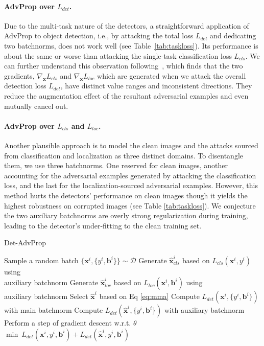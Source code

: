 \documentclass[final]{cvpr}
\begin{document}
\paragraph{AdvProp over $L_{det}$.}
Due to the multi-task nature of the detectors, a straightforward application of AdvProp to object detection, i.e., by attacking the total loss $L_{det}$ and dedicating two batchnorms, does not work well (see Table~\ref{tab:taskloss}). Its performance is about the same or worse than attacking the single-task classification loss $L_{cls}$. We can further understand this observation following~\cite{zhang2019towards}, which finds that the two gradients, $\nabla_\textbf{x}L_{cls}$ and $\nabla_\textbf{x}L_{loc}$ which are generated when we attack the overall detection loss $L_{det}$, have distinct value ranges and inconsistent directions. They reduce the augmentation effect of the resultant adversarial examples and even mutually cancel out.


\vspace{-10pt}
\paragraph{AdvProp over $L_{cls}$ and $L_{loc}$.}
Another plausible approach is to model the clean images and the attacks sourced from classification and localization as three distinct domains. To disentangle them, we use three batchnorms. One reserved for clean images, another accounting for the adversarial examples generated by attacking the classification loss, and the last for the localization-sourced adversarial examples.
However, this method hurts the detectors' performance on clean images though it yields the highest robustness on corrupted images (see Table \ref{tab:taskloss}). We conjecture the two auxiliary batchnorms are overly strong regularization during training, leading to the detector's under-fitting to the clean training set.


\begin{algorithm}[!t]
\caption{Det-AdvProp}
\begin{algorithmic}[1]
\STATE Sample a random batch $\{\textbf{x}^i,\{y^i,\textbf{b}^i\}\}\sim \mathcal{D}$
\STATE Generate $\hat{\textbf{x}}^i_{cls}$ based on $L_{cls}(\textbf{x}^i,y^i)$ using \\ auxiliary batchnorm
\STATE Generate $\hat{\textbf{x}}^i_{loc}$ based on $L_{loc}(\textbf{x}^i,\textbf{b}^i)$ using \\ auxiliary batchnorm
\STATE Select $\hat{\textbf{x}}^i$ based on Eq \eqref{eq:mma}
\STATE Compute $L_{det}(\textbf{x}^i,\{y^i,\textbf{b}^i\})$ with main batchnorm
\STATE Compute $L_{det}(\hat{\textbf{x}}^i,\{y^i,\textbf{b}^i\})$ with auxiliary batchnorm
\STATE Perform a step of gradient descent w.r.t. $\theta$ \\ 
$\min\ L_{det}(\textbf{x}^i,y^i,\textbf{b}^i)+L_{det}(\hat{\textbf{x}}^i,y^i,\textbf{b}^i)$
\ENDFOR
\end{algorithmic}
\label{alg:schema}
\end{algorithm}
\end{document}

